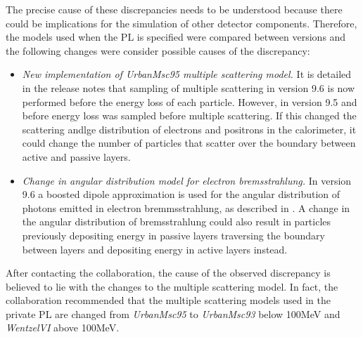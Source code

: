 The precise cause of these discrepancies needs to be understood because there could be implications for the simulation of other detector components.  Therefore, the models used when the \lhcb PL is specified were compared between versions and the following changes were consider possible causes of the discrepancy:
\begin{itemize}
\item \textit{New implementation of UrbanMsc95 multiple scattering model.}  It is detailed in the release notes that sampling of multiple scattering in version 9.6 is now performed before the energy loss of each particle.  However, in version 9.5 and before energy loss was sampled before multiple scattering.  If this changed the scattering andlge distribution of electrons and positrons in the calorimeter, it could change the number of particles that scatter over the boundary between active and passive layers.
\item \textit{Change in angular distribution model for electron bremsstrahlung.} In version 9.6 a boosted dipole approximation is used for the angular distribution of photons emitted in electron bremmsstrahlung, as described in \cite{:/content/aip/journal/apl/80/17/10.1063/1.1473684}.  A change in the angular distribution of bremsstrahlung could also result in particles previously depositing energy in passive layers traversing the boundary between layers and depositing energy in active layers instead.
\end{itemize}

After contacting the \geant collaboration, the cause of the observed discrepancy is believed to lie with the changes to the multiple scattering model.  In fact, the \geant collaboration recommended that the multiple scattering models used in the \lhcb private PL are changed from \textit{UrbanMsc95} to \textit{UrbanMsc93} below 100MeV and \textit{WentzelVI} above 100MeV.
  









